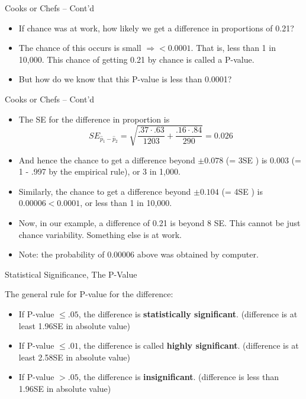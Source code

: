 \documentclass[14pt]{beamer}\usepackage[]{graphicx}\usepackage[]{color}
\begin{document}
\begin{frame}[fragile]{Cooks or Chefs -- Cont'd}

\begin{itemize}
\item If chance was at work, how likely we get a difference in proportions of  0.21?
\item The chance of this occurs is small $\Rightarrow < 0.0001$. That is, less than 1 in 10,000.  This chance of getting 0.21 by chance is called a P-value.
\item But how do we know that this P-value is less than 0.0001?
\end{itemize}
\end{frame}

\begin{frame}[fragile]{Cooks or Chefs -- Cont'd}

{\small{
\begin{itemize}
\item The SE for the difference in proportion is
$$ SE_{\hat{p}_1 - \hat{p}_2} = \sqrt{ \frac{ .37 \cdot .63}{1203} + \frac{ .16 \cdot .84}{290} } = 0.026 $$ 
\item And hence the chance to get a difference beyond $\pm 0.078$ (= 3SE ) is 0.003  (= 1 - .997 by the empirical rule), or 3 in 1,000.
\item Similarly, the chance to get a difference beyond $\pm 0.104$ (= 4SE ) is $0.00006 < 0.0001$, or less than 1 in 10,000.
\item Now, in our example, a difference of 0.21 is beyond 8 SE. This cannot be  just chance variability.  Something else is at work.
\item Note: the probability of 0.00006 above was obtained by computer.
\end{itemize}
}}
\end{frame}

\begin{frame}[fragile]{Statistical Significance, The P-Value}

The general rule for P-value for the difference:

\begin{itemize}
\item If P-value $\le .05$, the difference is \textbf{statistically significant}.  (difference is at least 1.96SE in absolute value)
\item If P-value $\le .01$, the difference is called \textbf{highly significant}.  (difference is at least 2.58SE in absolute value)
\item If P-value $> .05$, the difference is \textbf{insignificant}. (difference is less  than 1.96SE in absolute value)
\end{itemize}
\end{frame}
\end{document}
